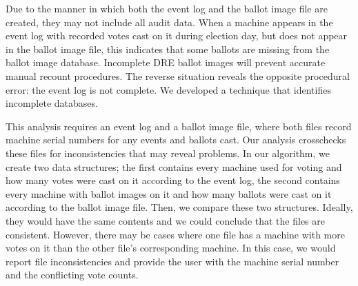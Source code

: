 Due to the manner in which both the event log and the ballot image
file are created, they may not include all audit data. When a machine
appears in the event log with recorded votes cast on it during
election day, but does not appear in the ballot image file, this
indicates that some ballots are missing from the ballot image
database. Incomplete DRE ballot images will prevent accurate manual
recount procedures. The reverse situation reveals the opposite
procedural error: the event log is not complete.  We developed a
technique that identifies incomplete databases.   

This analysis requires an event log and a ballot image file, where
both files record machine serial numbers for any events and ballots
cast.  Our analysis crosschecks these files for inconsistencies that
may reveal problems.  In our algorithm, we create two data structures;
the first contains every machine used for voting and how many votes
were cast on it according to the event log, the second contains every
machine with ballot images on it and how many ballots were cast on it
according to the ballot image file.  Then, we compare these two
structures.  Ideally, they would have the same contents and we could
conclude that the files are consistent.  However, there may be cases
where one file has a machine with more votes on it than the other
file's corresponding machine.  In this case, we would report file
inconsistencies and provide the user with the machine serial number
and the conflicting vote counts.      
